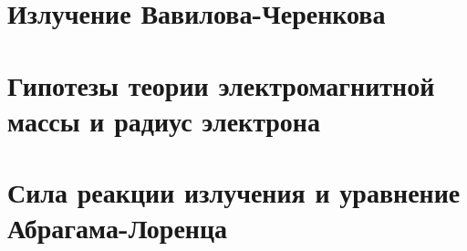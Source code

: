 \begin{multicols*}{2}
		\section{Излучение Вавилова-Черенкова}
		
		\section{Гипотезы теории электромагнитной массы и радиус электрона}
		
		\section{Сила реакции излучения и уравнение Абрагама-Лоренца}
		
	\end{multicols*}
